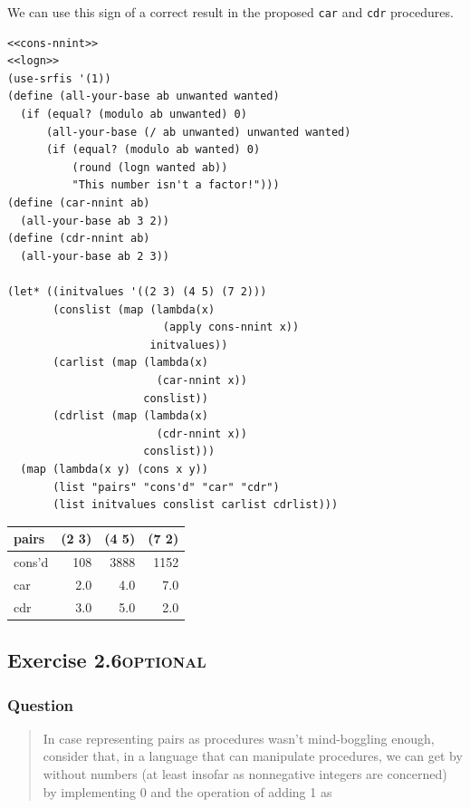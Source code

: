\documentclass[final,fleqn,titlepage,twoside]{article}
\begin{document}
We can use this sign of a correct result in the proposed \texttt{car} and
\texttt{cdr} procedures.

\begin{verbatim}
<<cons-nnint>>
<<logn>>
(use-srfis '(1))
(define (all-your-base ab unwanted wanted)
  (if (equal? (modulo ab unwanted) 0)
      (all-your-base (/ ab unwanted) unwanted wanted)
      (if (equal? (modulo ab wanted) 0)
          (round (logn wanted ab))
          "This number isn't a factor!")))
(define (car-nnint ab)
  (all-your-base ab 3 2))
(define (cdr-nnint ab)
  (all-your-base ab 2 3))

(let* ((initvalues '((2 3) (4 5) (7 2)))
       (conslist (map (lambda(x)
                        (apply cons-nnint x))
                      initvalues))
       (carlist (map (lambda(x)
                       (car-nnint x))
                     conslist))
       (cdrlist (map (lambda(x)
                       (cdr-nnint x))
                     conslist)))
  (map (lambda(x y) (cons x y))
       (list "pairs" "cons'd" "car" "cdr")
       (list initvalues conslist carlist cdrlist)))
\end{verbatim}

\begin{center}
\begin{tabular}{lrrr}
pairs & (2 3) & (4 5) & (7 2)\\[0pt]
\hline
cons'd & 108 & 3888 & 1152\\[0pt]
car & 2.0 & 4.0 & 7.0\\[0pt]
cdr & 3.0 & 5.0 & 2.0\\[0pt]
\end{tabular}
\end{center}

\subsection{Exercise 2.6\hfill{}\textsc{optional}}
\label{sec:org057e873}
\subsubsection{Question}
\label{sec:org9205d28}
\begin{quote}
In case representing pairs as procedures wasn't mind-boggling enough, consider
that, in a language that can manipulate procedures, we can get by without
numbers (at least insofar as nonnegative integers are concerned) by implementing
0 and the operation of adding 1 as
\end{quote}
\end{document}
